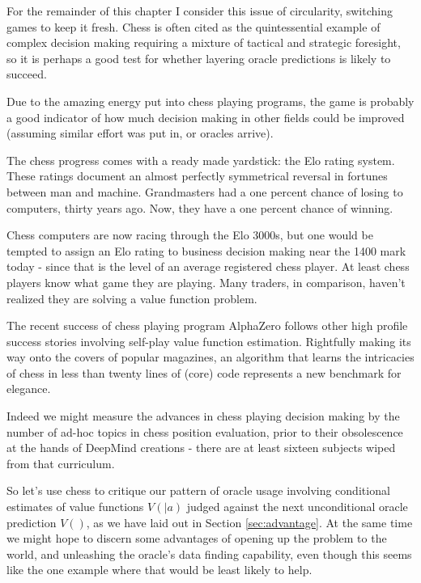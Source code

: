 For the remainder of this chapter I consider this issue of circularity, switching games to keep it fresh. Chess is often cited as the quintessential example of complex decision making requiring a mixture of tactical and strategic foresight, so it is perhaps a good test for whether layering oracle predictions is likely to succeed. 

Due to the amazing energy put into chess playing programs, the game is probably a good indicator of how much decision making in other fields could be improved (assuming similar effort was put in, or oracles arrive). 

The chess progress comes with a ready made yardstick: the Elo rating system. These ratings document an almost perfectly symmetrical reversal in fortunes between man and machine. Grandmasters had a one percent chance of losing to computers, thirty years ago. Now, they have a one percent chance of winning.

Chess computers are now racing through the Elo 3000s, but one would be tempted to assign an Elo rating to business decision making near the 1400 mark today - since that is the level of an average registered chess player. At least chess players know what game they are playing. Many traders, in comparison, haven't realized they are solving a value function problem. 


The recent success of chess playing program AlphaZero follows other high profile success stories involving self-play value function estimation. Rightfully making its way onto the covers of popular magazines, an algorithm that learns the intricacies of chess in less than twenty lines of (core) code represents a new benchmark for elegance.


Indeed we might measure the advances in chess playing decision making by the number of ad-hoc topics in chess position evaluation, prior to their obsolescence at the hands of DeepMind creations - there are at least sixteen subjects wiped from that curriculum. 


So let's use chess to critique our pattern of oracle usage involving conditional estimates of value functions $V(|a)$ judged against the next unconditional oracle prediction $V()$, as we have laid out in Section \ref{sec:advantage}. At the same time we might hope to discern some advantages of opening up the problem to the world, and unleashing the oracle's data finding capability, even though this seems like the one example where that would be least likely to help. 


